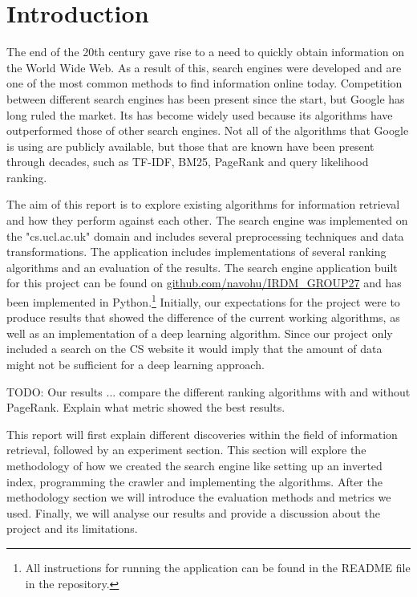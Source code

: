 \section{Introduction}

The end of the 20th century gave rise to a need to quickly obtain information on the World Wide Web. As a result of this, search engines were developed and are one of the most common methods to find information online today. Competition between different search engines has been present since the start, but Google has long ruled the market. Its has become widely used because its algorithms have outperformed those of other search engines. Not all of the algorithms that Google is using are publicly available, but those that are known have been present through decades, such as TF-IDF, BM25, PageRank and query likelihood ranking.

The aim of this report is to explore existing algorithms for information retrieval and how they perform against each other. The search engine was implemented on the "cs.ucl.ac.uk" domain and includes several preprocessing techniques and data transformations. The application includes implementations of several ranking algorithms and an evaluation of the results. The search engine application built for this project can be found on \url{github.com/navohu/IRDM_GROUP27} and has been implemented in Python.\footnote{All instructions for running the application can be found in the README file in the repository.} Initially, our expectations for the project were to produce results that showed the difference of the current working algorithms, as well as an implementation of a deep learning algorithm. Since our project only included a search on the CS website it would imply that the amount of data might not be sufficient for a deep learning approach.



TODO: Our results ... compare the different ranking algorithms with and without PageRank. Explain what metric showed the best results.


This report will first explain different discoveries within the field of information retrieval, followed by an experiment section. This section will explore the methodology of how we created the search engine like setting up an inverted index, programming the crawler and implementing the algorithms. After the methodology section we will introduce the evaluation methods and metrics we used. Finally, we will analyse our results and provide a discussion about the project and its limitations.


